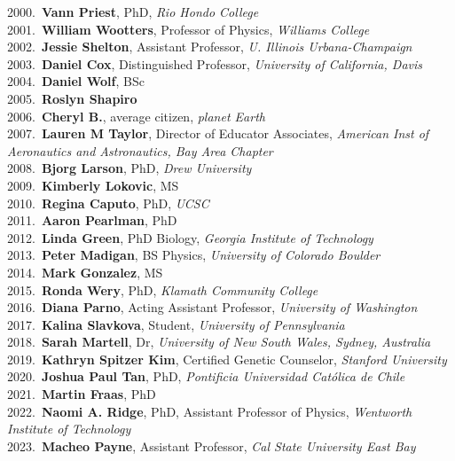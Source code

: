 2000.~{\bf Vann Priest}, PhD, {\sl Rio Hondo College} \\
2001.~{\bf William Wootters}, Professor of Physics, {\sl Williams College} \\
2002.~{\bf Jessie Shelton}, Assistant Professor, {\sl U. Illinois Urbana-Champaign} \\
2003.~{\bf Daniel Cox}, Distinguished Professor, {\sl University of California, Davis} \\
2004.~{\bf Daniel Wolf}, BSc \\
2005.~{\bf Roslyn Shapiro} \\
2006.~{\bf Cheryl B.}, average citizen, {\sl planet Earth} \\
2007.~{\bf Lauren M Taylor}, Director of Educator Associates, {\sl American Inst of Aeronautics and Astronautics, Bay Area Chapter} \\
2008.~{\bf Bjorg Larson}, PhD, {\sl Drew University } \\
2009.~{\bf Kimberly Lokovic}, MS \\
2010.~{\bf Regina Caputo}, PhD, {\sl UCSC} \\
2011.~{\bf Aaron Pearlman}, PhD \\
2012.~{\bf Linda Green}, PhD Biology, {\sl Georgia Institute of Technology} \\
2013.~{\bf Peter Madigan}, BS Physics, {\sl University of Colorado Boulder} \\
2014.~{\bf Mark Gonzalez}, MS \\
2015.~{\bf Ronda Wery}, PhD, {\sl Klamath Community College} \\
2016.~{\bf Diana Parno}, Acting Assistant Professor, {\sl University of Washington} \\
2017.~{\bf Kalina Slavkova}, Student, {\sl University of Pennsylvania} \\
2018.~{\bf Sarah Martell}, Dr, {\sl University of New South Wales, Sydney, Australia} \\
2019.~{\bf Kathryn Spitzer Kim}, Certified Genetic Counselor, {\sl Stanford University} \\
2020.~{\bf Joshua Paul Tan}, PhD, {\sl Pontificia Universidad Cat\'{o}lica de Chile} \\
2021.~{\bf Martin Fraas}, PhD \\
2022.~{\bf Naomi A. Ridge}, PhD, Assistant Professor of Physics, {\sl Wentworth Institute of Technology} \\
2023.~{\bf Macheo Payne}, Assistant Professor, {\sl Cal State University East Bay} \\
